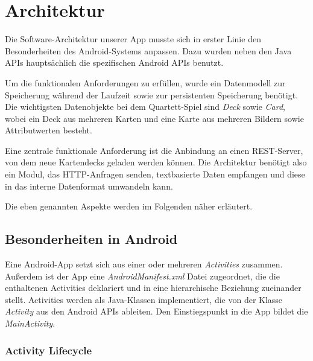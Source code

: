 \chapter{Architektur}
\label{cha:architektur}

Die Software-Architektur unserer App musste sich in erster Linie den Besonderheiten des Android-Systems anpassen. Dazu wurden neben den Java APIs hauptsächlich die spezifischen Android APIs benutzt.

Um die funktionalen Anforderungen zu erfüllen, wurde ein Datenmodell zur Speicherung während der Laufzeit sowie zur persistenten Speicherung benötigt. Die wichtigsten Datenobjekte bei dem Quartett-Spiel sind \emph{Deck} sowie \emph{Card}, wobei ein Deck aus mehreren Karten und eine Karte aus mehreren Bildern sowie Attributwerten besteht.

Eine zentrale funktionale Anforderung ist die Anbindung an einen REST-Server, von dem neue Kartendecks geladen werden können. Die Architektur benötigt also ein Modul, das HTTP-Anfragen senden, textbasierte Daten empfangen und diese in das interne Datenformat umwandeln kann.

Die eben genannten Aspekte werden im Folgenden näher erläutert.

\section{Besonderheiten in Android}
\label{sec:besonderheiten_android}

Eine Android-App setzt sich aus einer oder mehreren \emph{Activities} zusammen. Außerdem ist der App eine \emph{AndroidManifest.xml} Datei zugeordnet, die die enthaltenen Activities deklariert und in eine hierarchische Beziehung zueinander stellt. Activities werden als Java-Klassen implementiert, die von der Klasse \emph{Activity} aus den Android APIs ableiten. Den Einstiegspunkt in die App bildet die \emph{MainActivity}.

\subsection{Activity Lifecycle}

